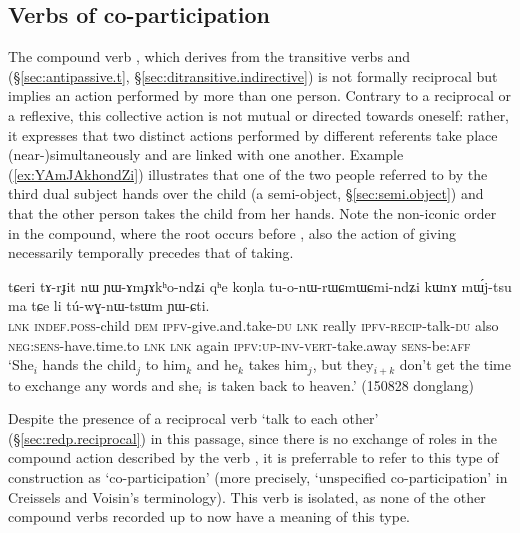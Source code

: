 \subsection{Verbs of co-participation} \label{sec:co.participation} 
The compound verb , which derives from the transitive verbs  and  (§\ref{sec:antipassive.t}, §\ref{sec:ditransitive.indirective}) is not formally reciprocal but implies an action performed by more than one person. Contrary to a reciprocal or a reflexive, this collective action is not mutual or directed towards oneself: rather, it expresses that two distinct actions performed by different referents take place (near-)simultaneously and are linked with one another. Example (\ref{ex:YAmJAkhondZi}) illustrates that one of the two people referred to by the third dual subject hands over the child (a semi-object, §\ref{sec:semi.object}) and that the other person takes the child from her hands. Note the non-iconic order in the compound, where  the root  occurs before , also the action of giving necessarily temporally precedes that of taking.

\begin{exe}
\ex \label{ex:YAmJAkhondZi}
\gll  tɕeri tɤ-rɟit nɯ ɲɯ-ɤmɟɤkʰo-ndʑi qʰe koŋla tu-o-nɯ-rɯɕmɯ\redp{}ɕmi-ndʑi kɯnɤ mɯ́j-tsu ma tɕe li tú-wɣ-nɯ-tsɯm ɲɯ-ɕti. \\
\textsc{lnk} \textsc{indef}.\textsc{poss}-child \textsc{dem} \textsc{ipfv}-give.and.take-\textsc{du} \textsc{lnk} really \textsc{ipfv}-\textsc{recip}-talk-\textsc{du} also \textsc{neg}:\textsc{sens}-have.time.to \textsc{lnk} \textsc{lnk} again \textsc{ipfv}:\textsc{up}-\textsc{inv}-\textsc{vert}-take.away \textsc{sens}-be:\textsc{aff} \\
\glt `She$_i$ hands the child$_j$ to him$_k$ and he$_k$ takes him$_j$, but they$_{i+k}$ don't get the time to exchange any words and she$_i$ is taken back to heaven.' (150828 donglang)
\end{exe}

Despite the presence of a reciprocal verb  `talk to each other' (§\ref{sec:redp.reciprocal}) in this passage, since there is no exchange of roles in the compound action described by the verb , it is preferrable to refer to this type of construction as `co-participation' (more precisely, `unspecified co-participation' in Creissels and Voisin's \citeyear{creissels08coparticipation} terminology). This verb is isolated, as none of the other compound verbs recorded up to now have a meaning of this type.

